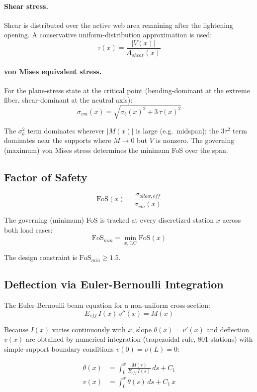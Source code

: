 \documentclass[11pt,letterpaper]{article}
\begin{document}
\paragraph{Shear stress.}
Shear is distributed over the active web area remaining after the lightening
opening.  A conservative uniform-distribution approximation is used:
\[
  \tau(x) = \frac{|V(x)|}{A_{shear}(x)}
\]

\paragraph{von Mises equivalent stress.}
For the plane-stress state at the critical point (bending-dominant at the
extreme fiber, shear-dominant at the neutral axis):
\[
  \sigma_{vm}(x) = \sqrt{\sigma_b(x)^2 + 3\,\tau(x)^2}
\]

The $\sigma_b^2$ term dominates wherever $|M(x)|$ is large (e.g.\ midspan);
the $3\tau^2$ term dominates near the supports where $M \to 0$ but $V$ is
nonzero.  The governing (maximum) von Mises stress determines the minimum
FoS over the span.

\subsection{Factor of Safety}

\[
  \mathrm{FoS}(x) = \frac{\sigma_{allow,eff}}{\sigma_{vm}(x)}
\]

The governing (minimum) FoS is tracked at every discretized station $x$
across both load cases:
\[
  \mathrm{FoS}_{min} = \min_{x,\,\text{LC}} \mathrm{FoS}(x)
\]

The design constraint is $\mathrm{FoS}_{min} \ge 1.5$.

\subsection{Deflection via Euler-Bernoulli Integration}

The Euler-Bernoulli beam equation for a non-uniform cross-section:
\[
  E_{eff}\,I(x)\,v''(x) = M(x)
\]

Because $I(x)$ varies continuously with $x$, slope $\theta(x) = v'(x)$
and deflection $v(x)$ are obtained by numerical integration (trapezoidal rule,
801 stations) with simple-support boundary conditions $v(0) = v(L) = 0$:

\begin{align*}
  \theta(x) &= \int_0^x \frac{M(s)}{E_{eff}\,I(s)}\,ds + C_1 \\
  v(x) &= \int_0^x \theta(s)\,ds + C_1\,x
\end{align*}
\end{document}
